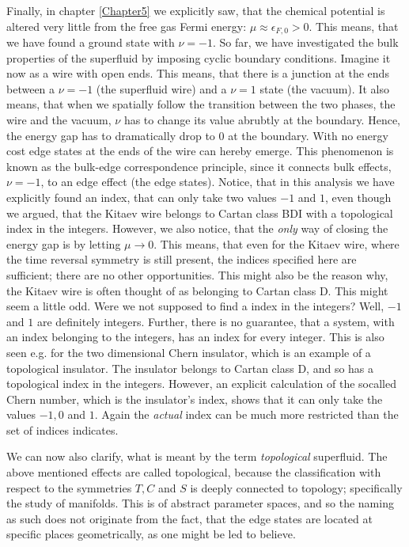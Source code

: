 Finally, in chapter \ref{Chapter5} we explicitly saw, that the chemical potential is altered very little from the free gas Fermi energy: $\mu \approx \epsilon_{F,0} > 0$. This means, that we have found a ground state with $\nu = -1$. So far, we have investigated the bulk properties of the superfluid by imposing cyclic boundary conditions. Imagine it now as a wire with open ends. This means, that there is a junction at the ends between a $\nu = -1$ (the superfluid wire) and a $\nu = 1$ state (the vacuum). It also means, that when we spatially follow the transition between the two phases, the wire and the vacuum, $\nu$ has to change its value abrubtly at the boundary. Hence, the energy gap has to dramatically drop to $0$ at the boundary. With no energy cost edge states at the ends of the wire can hereby emerge. This phenomenon is known as the bulk-edge correspondence principle, since it connects bulk effects, $\nu = -1$, to an edge effect (the edge states). Notice, that in this analysis we have explicitly found an index, that can only take two values $-1$ and $1$, even though we argued, that the Kitaev wire belongs to Cartan class BDI with a topological index in the integers. However, we also notice, that the \textit{only} way of closing the energy gap is by letting $\mu \to 0$. This means, that even for the Kitaev wire, where the time reversal symmetry is still present, the indices specified here are sufficient; there are no other opportunities. This might also be the reason why, the Kitaev wire is often thought of as belonging to Cartan class D. This might seem a little odd. Were we not supposed to find a index in the integers? Well, $-1$ and $1$ are definitely integers. Further, there is no guarantee, that a system, with an index belonging to the integers, has an index for every integer. This is also seen e.g. for the two dimensional Chern insulator, which is an example of a topological insulator. The insulator belongs to Cartan class D, and so has a topological index in the integers. However, an explicit calculation of the socalled Chern number, which is the insulator's index, shows that it can only take the values $-1,0$ and $1$. Again the \textit{actual} index can be much more restricted than the set of indices indicates.  

We can now also clarify, what is meant by the term \textit{topological} superfluid. The above mentioned effects are called topological, because the classification with respect to the symmetries $T,C$ and $S$ is deeply connected to topology; specifically the study of manifolds. This is of abstract parameter spaces, and so the naming as such does not originate from the fact, that the edge states are located at specific places geometrically, as one might be led to believe. 

